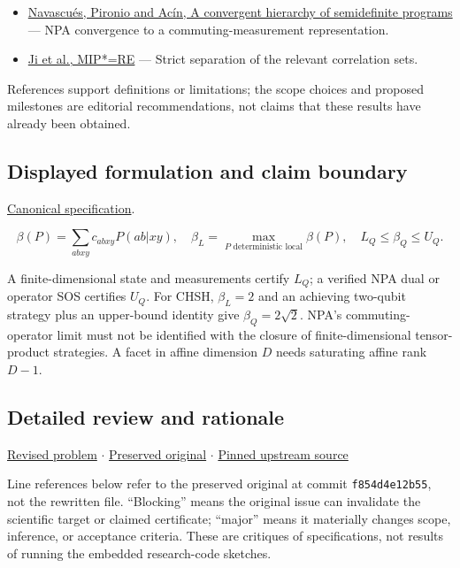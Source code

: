 \documentclass[
  11pt,
]{article}
\begin{document}
\begin{itemize}
\item
  \href{https://arxiv.org/abs/0803.4290}{Navascués, Pironio and Acín, A
  convergent hierarchy of semidefinite programs} --- NPA convergence to
  a commuting-measurement representation.
\item
  \href{https://arxiv.org/abs/2001.04383}{Ji et al., MIP*=RE} --- Strict
  separation of the relevant correlation sets.
\end{itemize}

References support definitions or limitations; the scope choices and
proposed milestones are editorial recommendations, not claims that these
results have already been obtained.

\subsection{Displayed formulation and claim boundary}

\href{https://github.com/rick-stevens-ai/Pure-Thought/blob/main/PRDs/22-Bell-Inequalities-Nonlocality.md}{Canonical
specification}.

\[\beta(P)=\sum_{abxy}c_{abxy}P(ab|xy),\quad
\beta_L=\max_{P\text{ deterministic local}}\beta(P),\quad
L_Q\le\beta_Q\le U_Q.\]

A finite-dimensional state and measurements certify \(L_Q\); a verified
NPA dual or operator SOS certifies \(U_Q\). For CHSH, \(\beta_L=2\) and
an achieving two-qubit strategy plus an upper-bound identity give
\(\beta_Q=2\sqrt2\). NPA's commuting-operator limit must not be
identified with the closure of finite-dimensional tensor-product
strategies. A facet in affine dimension \(D\) needs saturating affine
rank \(D-1\).

\subsection{Detailed review and rationale}

\href{https://github.com/rick-stevens-ai/Pure-Thought/blob/main/PRDs/22-Bell-Inequalities-Nonlocality.md}{Revised
problem} \ensuremath{\cdot}
\href{https://github.com/rick-stevens-ai/Pure-Thought/blob/main/archive/original-PRDs/22-Bell-Inequalities-Nonlocality.md}{Preserved
original} \ensuremath{\cdot}
\href{https://github.com/rick-stevens-ai/Pure-Thought/blob/f854d4e12b55c1f5b5c2a964b75f2d23496d981e/PRDs/22-Bell-Inequalities-Nonlocality.md}{Pinned
upstream source}

Line references below refer to the preserved original at commit
\texttt{f854d4e12b55}, not the rewritten file. ``Blocking'' means the
original issue can invalidate the scientific target or claimed
certificate; ``major'' means it materially changes scope, inference, or
acceptance criteria. These are critiques of specifications, not results
of running the embedded research-code sketches.
\end{document}
